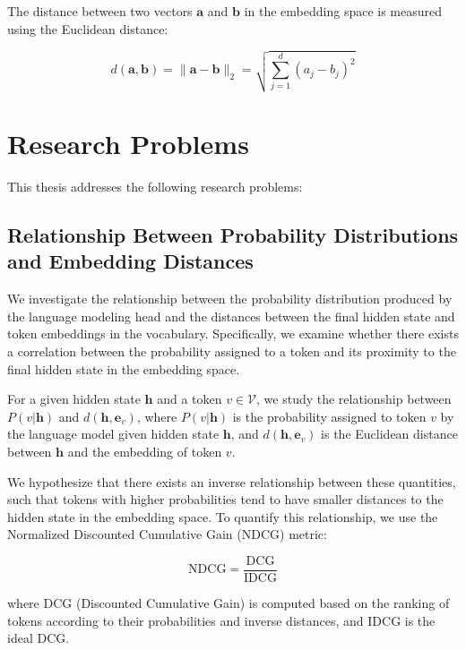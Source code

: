 The distance between two vectors $\mathbf{a}$ and $\mathbf{b}$ in the embedding space is measured using the Euclidean distance:

\begin{equation}
    d(\mathbf{a}, \mathbf{b}) = \|\mathbf{a} - \mathbf{b}\|_2 = \sqrt{\sum_{j=1}^d (a_j - b_j)^2}
    \label{eq::euclidean}
\end{equation}

\section{Research Problems}

This thesis addresses the following research problems:

\subsection{Relationship Between Probability Distributions and Embedding Distances}

We investigate the relationship between the probability distribution produced by the language modeling head and the distances between the final hidden state and token embeddings in the vocabulary. Specifically, we examine whether there exists a correlation between the probability assigned to a token and its proximity to the final hidden state in the embedding space.

For a given hidden state $\mathbf{h}$ and a token $v \in \mathcal{V}$, we study the relationship between $P(v|\mathbf{h})$ and $d(\mathbf{h}, \mathbf{e}_v)$, where $P(v|\mathbf{h})$ is the probability assigned to token $v$ by the language model given hidden state $\mathbf{h}$, and $d(\mathbf{h}, \mathbf{e}_v)$ is the Euclidean distance between $\mathbf{h}$ and the embedding of token $v$.

We hypothesize that there exists an inverse relationship between these quantities, such that tokens with higher probabilities tend to have smaller distances to the hidden state in the embedding space. To quantify this relationship, we use the Normalized Discounted Cumulative Gain (NDCG) metric:

\begin{equation}
    \text{NDCG} = \frac{\text{DCG}}{\text{IDCG}}
    \label{eq::ndcg}
\end{equation}

where DCG (Discounted Cumulative Gain) is computed based on the ranking of tokens according to their probabilities and inverse distances, and IDCG is the ideal DCG.

